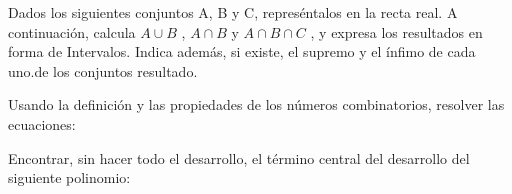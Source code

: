 \documentclass[addpoints,spanish, 12pt,a4paper]{exam}
\begin{document}
        \begin{questions}
        \question Dados los siguientes conjuntos A, B y C, represéntalos en la recta real. A continuación, calcula $A \cup  B$ , $A \cap B$ y $A \cap B \cap C$ , 
y expresa los resultados en forma de Intervalos. 
Indica además, si existe, el supremo y el ínfimo de cada uno.de los conjuntos resultado.
        \begin{multicols}{1} 
        \begin{parts} \part[2]  $ A=\left\{ x \in \mathbb{R}| 6 \leq x \wedge x < 8 \right\}, \\ B=\left(-\infty, -3\right) \cup \left(3, \infty\right)  y \\  C=\left\{ x \in \mathbb{R}| \left|{x + 2}\right|\geq12 \right\} \\ $  \begin{solution}  $ C=\left(-\infty, -14\right] \cup \left[10, \infty\right) \ \ A \cup  B = \left(-\infty, -3\right) \cup \left(3, \infty\right)  \\  A \cap B= \left[6, 8\right)   \\  A \cap B  \cap C= \emptyset $  \end{solution}
        \end{parts}
        \end{multicols}
        \question Usando la definición y las propiedades de los números combinatorios, resolver las ecuaciones:
        \begin{multicols}{1} 
        \end{multicols}
        \question Encontrar, sin hacer todo el desarrollo, el término central del desarrollo del siguiente polinomio:
        \begin{multicols}{1} 
\end{multicols}
\end{questions}
\end{document}
